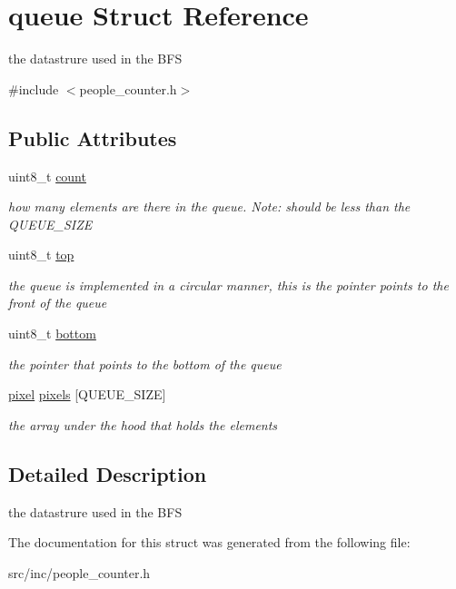\hypertarget{structqueue}{}\section{queue Struct Reference}
\label{structqueue}


the datastrure used in the B\+FS  




{\ttfamily \#include $<$people\+\_\+counter.\+h$>$}

\subsection*{Public Attributes}
\begin{DoxyCompactItemize}
\item 
\mbox{\label{structqueue_a0512dbdb09e0b351c29aeae66a7d9c35}} 
uint8\+\_\+t \mbox{\hyperlink{structqueue_a0512dbdb09e0b351c29aeae66a7d9c35}{count}}
\begin{DoxyCompactList}\small\item\em how many elements are there in the queue. Note\+: should be less than the Q\+U\+E\+U\+E\+\_\+\+S\+I\+ZE \end{DoxyCompactList}\item 
\mbox{\label{structqueue_a72f104687305eeaa5bb39b567f3ea3fa}} 
uint8\+\_\+t \mbox{\hyperlink{structqueue_a72f104687305eeaa5bb39b567f3ea3fa}{top}}
\begin{DoxyCompactList}\small\item\em the queue is implemented in a circular manner, this is the pointer points to the front of the queue \end{DoxyCompactList}\item 
\mbox{\label{structqueue_a3d85affb4fe9ba1292fa772af2af795d}} 
uint8\+\_\+t \mbox{\hyperlink{structqueue_a3d85affb4fe9ba1292fa772af2af795d}{bottom}}
\begin{DoxyCompactList}\small\item\em the pointer that points to the bottom of the queue \end{DoxyCompactList}\item 
\mbox{\label{structqueue_a8b1ecfe795fa89b298dfcfb99a85e38a}} 
\mbox{\hyperlink{structpixel}{pixel}} \mbox{\hyperlink{structqueue_a8b1ecfe795fa89b298dfcfb99a85e38a}{pixels}} \mbox{[}Q\+U\+E\+U\+E\+\_\+\+S\+I\+ZE\mbox{]}
\begin{DoxyCompactList}\small\item\em the array under the hood that holds the elements \end{DoxyCompactList}\end{DoxyCompactItemize}


\subsection{Detailed Description}
the datastrure used in the B\+FS 

The documentation for this struct was generated from the following file\+:\begin{DoxyCompactItemize}
\item 
src/inc/people\+\_\+counter.\+h\end{DoxyCompactItemize}
